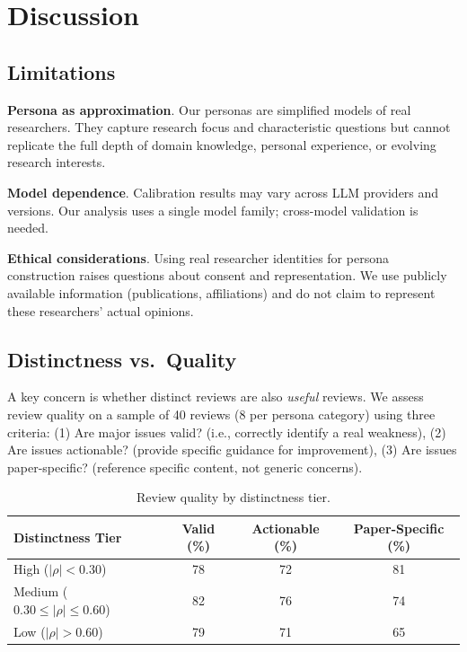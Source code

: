\section{Discussion}

\subsection{Limitations}

\textbf{Persona as approximation}. Our personas are simplified models of real researchers. They capture research focus and characteristic questions but cannot replicate the full depth of domain knowledge, personal experience, or evolving research interests.

\textbf{Model dependence}. Calibration results may vary across LLM providers and versions. Our analysis uses a single model family; cross-model validation is needed.

\textbf{Ethical considerations}. Using real researcher identities for persona construction raises questions about consent and representation. We use publicly available information (publications, affiliations) and do not claim to represent these researchers' actual opinions.

\subsection{Distinctness vs.\ Quality}

A key concern is whether distinct reviews are also \emph{useful} reviews. We assess review quality on a sample of 40 reviews (8 per persona category) using three criteria: (1) Are major issues valid? (i.e., correctly identify a real weakness), (2) Are issues actionable? (provide specific guidance for improvement), (3) Are issues paper-specific? (reference specific content, not generic concerns).

\begin{table}[h]
\centering
\small
\begin{tabular}{lccc}
\toprule
Distinctness Tier & Valid (\%) & Actionable (\%) & Paper-Specific (\%) \\
\midrule
High ($|\rho| < 0.30$) & 78 & 72 & 81 \\
Medium ($0.30 \leq |\rho| \leq 0.60$) & 82 & 76 & 74 \\
Low ($|\rho| > 0.60$) & 79 & 71 & 65 \\
\bottomrule
\end{tabular}
\caption{Review quality by distinctness tier.}
\end{table}

